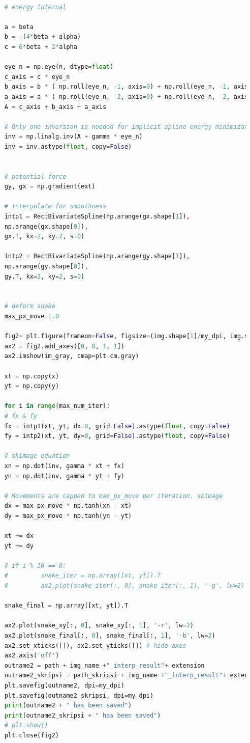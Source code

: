 \begin{lstlisting}[language=Python, basicstyle=\tiny]
	
	# energy internal
	
	a = beta
	b = -(4*beta + alpha)
	c = 6*beta + 2*alpha
	
	eye_n = np.eye(n, dtype=float)
	c_axis = c * eye_n
	b_axis = b * ( np.roll(eye_n, -1, axis=0) + np.roll(eye_n, -1, axis=1) )
	a_axis = a * ( np.roll(eye_n, -2, axis=0) + np.roll(eye_n, -2, axis=1) )
	A = c_axis + b_axis + a_axis
	
	# Only one inversion is needed for implicit spline energy minimization. skimage
	inv = np.linalg.inv(A + gamma * eye_n)
	inv = inv.astype(float, copy=False)
	
	
	# potential force
	gy, gx = np.gradient(ext)
	
	# Interpolate for smoothness
	intp1 = RectBivariateSpline(np.arange(gx.shape[1]),
	np.arange(gx.shape[0]),
	gx.T, kx=2, ky=2, s=0)
	
	intp2 = RectBivariateSpline(np.arange(gy.shape[1]),
	np.arange(gy.shape[0]),
	gy.T, kx=2, ky=2, s=0)
	
	
	# deform snake
	max_px_move=1.0
	
	fig2= plt.figure(frameon=False, figsize=(img.shape[1]/my_dpi, img.shape[0]/my_dpi), dpi=my_dpi)
	ax2 = fig2.add_axes([0, 0, 1, 1])
	ax2.imshow(im_gray, cmap=plt.cm.gray)
	
	xt = np.copy(x)
	yt = np.copy(y)
	
	for i in range(max_num_iter):
	# fx & fy
	fx = intp1(xt, yt, dx=0, grid=False).astype(float, copy=False)
	fy = intp2(xt, yt, dy=0, grid=False).astype(float, copy=False)
	
	# skimage equation
	xn = np.dot(inv, gamma * xt + fx)
	yn = np.dot(inv, gamma * yt + fy)
	
	# Movements are capped to max_px_move per iteration. skimage
	dx = max_px_move * np.tanh(xn - xt)
	dy = max_px_move * np.tanh(yn - yt)
	
	xt += dx
	yt += dy
	
	# if i % 10 == 0:
	#         snake_iter = np.array([xt, yt]).T
	#         ax2.plot(snake_iter[:, 0], snake_iter[:, 1], '-g', lw=2)
	
	snake_final = np.array([xt, yt]).T
	
	ax2.plot(snake_xy[:, 0], snake_xy[:, 1], '-r', lw=2)
	ax2.plot(snake_final[:, 0], snake_final[:, 1], '-b', lw=2)
	ax2.set_xticks([]), ax2.set_yticks([]) # hide axes
	ax2.axis('off')
	outname2 = path + img_name +"_interp_result"+ extension
	outname2_skripsi = path_skripsi + img_name +"_interp_result"+ extension
	plt.savefig(outname2, dpi=my_dpi)
	plt.savefig(outname2_skripsi, dpi=my_dpi)
	print(outname2 + " has been saved")
	print(outname2_skripsi + " has been saved")
	# plt.show()
	plt.close(fig2)
	

\end{lstlisting}
